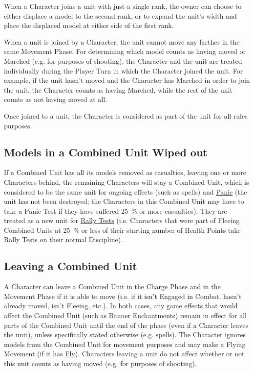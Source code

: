 When a Character joins a unit with just a single rank, the owner can choose to either displace a model to the second rank, or to expand the unit's width and place the displaced model at either side of the first rank.

When a unit is joined by a Character, the unit cannot move any farther in the same Movement Phase. For determining which model counts as having moved or Marched (e.g. for purposes of shooting), the Character and the unit are treated individually during the Player Turn in which the Character joined the unit. For example, if the unit hasn't moved and the Character has Marched in order to join the unit, the Character counts as having Marched, while the rest of the unit counts as not having moved at all.

Once joined to a unit, the Character is considered as part of the unit for all rules purposes.

\subsection{\rnf{} Models in a Combined Unit Wiped out}

If a Combined Unit has all its \rnf{} models removed as casualties, leaving one or more Characters behind, the remaining Characters will stay a Combined Unit, which is considered to be the same unit for ongoing effects (such as \hyperref[one_turn]{\oneturn} spells) and \hyperref[panic_test]{Panic} (the unit has not been destroyed; the Characters in this Combined Unit may have to take a Panic Test if they have suffered \SI{25}{\percent} or more casualties). They are treated as a new unit for \hyperref[rally_fleeing_units]{Rally Tests} (i.e. Characters that were part of Fleeing Combined Units at \SI{25}{\percent} or less of their starting number of Health Points take Rally Tests on their normal Discipline).

\newpage
\subsection{Leaving a Combined Unit}

A Character can leave a Combined Unit in the Charge Phase and in the Movement Phase if it is able to move (i.e. if it isn't Engaged in Combat, hasn't already moved, isn't Fleeing, etc.). In both cases, any game effects that would affect the Combined Unit (such as Banner Enchantments) remain in effect for all parts of the Combined Unit until the end of the phase (even if a Character leaves the unit), unless specifically stated otherwise (e.g. \oneturn{} spells). The Character ignores models from the Combined Unit for movement purposes and may make a Flying Movement (if it has \hyperref[fly]{Fly}). Characters leaving a unit do not affect whether or not this unit counts as having moved (e.g. for purposes of shooting).


